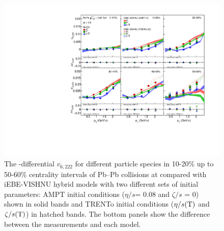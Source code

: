 \documentclass[ALICE,manyauthors]{cernphprep}
\providecommand{\DIFaddbeginFL}{} %
\providecommand{\DIFaddendFL}{} %
\providecommand{\DIFdelbeginFL}{} %
\providecommand{\DIFdelendFL}{} %
\begin{document}
\begin{figure}[!htb]
\begin{center}
\DIFdelbeginFL %
\DIFdelendFL \DIFaddbeginFL \includegraphics[scale=0.73]{figures/model/TrentoAndAMPT_v6222_gap00_PID2.pdf}
\DIFaddendFL \end{center}
\caption{The \pT-differential $v_{6,222}$ for different particle species in 10-20\% up to 50-60\% centrality intervals of Pb--Pb collisions at \sNN compared with iEBE-VISHNU hybrid models with two different sets of initial parameters: AMPT initial conditions ($\eta/s$= 0.08 and $\zeta/s$ = 0) shown in solid bands and TRENTo initial conditions ($\eta/s({\rm T})$ and $\zeta/s({\rm T})$) in hatched bands. The bottom panels show the difference between the measurements and each model.}
\label{v6222_model}
\end{figure}
\end{document}
